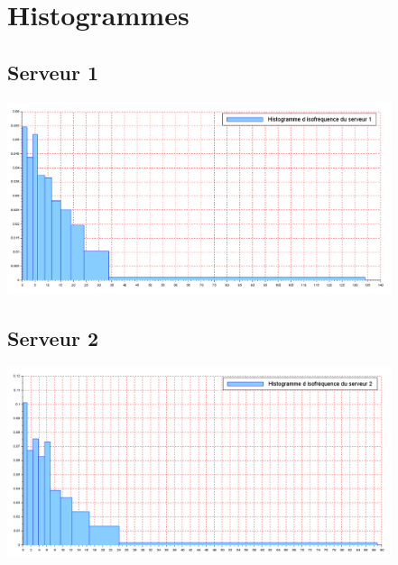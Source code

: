 \documentclass{article}
\begin{document}
\paragraph{}

\section{Histogrammes}

\subsection{Serveur 1}
\begin{center}
\includegraphics[width=425px]{img/S1_histo.png}
\end{center}
\paragraph{}

\subsection{Serveur 2}
\begin{center}
\includegraphics[width=425px]{img/S2_histo.png}
\end{center}
\paragraph{}
\end{document}
